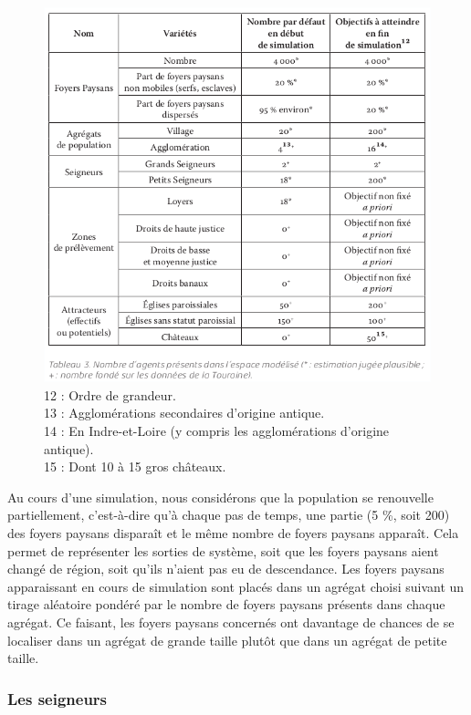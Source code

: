 \documentclass[12pt, a4paper, oneside]{book}
\begin{document}
	\begin{figure}[H]
		\centering
		\includegraphics[width=1\linewidth]{src/Chapitre_TMD/Tab3.png}
		\caption*{
			\small
			12 : Ordre de grandeur.\\
			13 : Agglomérations secondaires d’origine antique. \\
			14 : En Indre-et-Loire (y compris les agglomérations d’origine antique).\\
			15 : Dont 10 à 15 gros châteaux.
	}
	\end{figure}
	
	Au cours d'une simulation, nous considérons que la population se renouvelle partiellement, c'est-à-dire qu'à chaque pas de temps, une partie (5 \%, soit 200) des foyers paysans disparaît et le même nombre de foyers paysans apparaît.
	Cela permet de représenter les sorties de système, soit que les foyers paysans aient changé de région, soit qu'ils n'aient pas eu de descendance. 
	Les foyers paysans apparaissant en cours de simulation sont placés dans un agrégat choisi suivant un tirage aléatoire pondéré par le nombre de foyers paysans présents dans chaque agrégat.
	Ce faisant, les foyers paysans concernés ont davantage de chances de se localiser dans un agrégat de grande taille plutôt que dans un agrégat de petite taille.
	
	\subsubsection{Les seigneurs}
	
\end{document}
